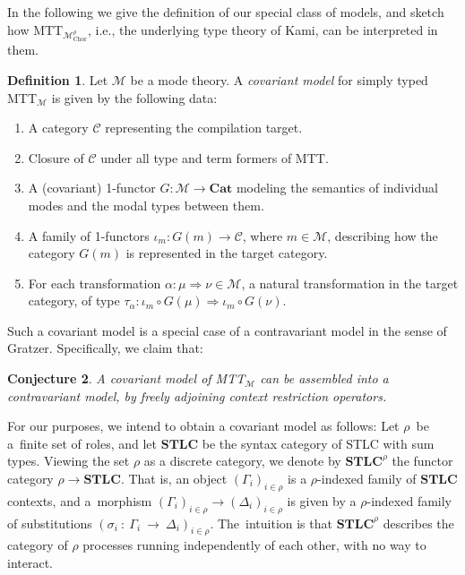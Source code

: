 \documentclass{scrartcl}
\theoremstyle{definition}
\newtheorem{definition}{Definition}
\theoremstyle{plain}
\newtheorem{conjecture}[definition]{Conjecture}
\begin{document}
In the following we give the definition of our special class of models, and
sketch how MTT${}_{\mathcal{M}^\rho_{\textrm{Chor}}}$, i.e., the underlying
type theory of Kami, can be interpreted in them.
\begin{definition}
  Let $\mathcal{M}$ be a mode theory. A \emph{covariant model} for
  simply typed MTT$_{\mathcal{M}}$ is given by the following data:
  \begin{enumerate}
  \item
    A category $\mathcal{C}$ representing the compilation target.
  \item
    Closure of $\mathcal{C}$ under all type and term formers of MTT.
  \item
    A (covariant) 1-functor $G : \mathcal{M} \to \textbf{Cat}$ modeling the
    semantics of individual modes and the modal types between them.
  \item
    A family of 1-functors $\iota_m : G(m) \to \mathcal{C}$, where $m \in
    \mathcal{M}$, describing how the category $G(m)$ is represented in the
    target category.
  \item
    For each transformation $\alpha : \mu \Rightarrow \nu \in \mathcal{M}$, a
    natural transformation in the target category, of type $\tau_\alpha :
    \iota_m \circ G(\mu) \Rightarrow \iota_m \circ G(\nu)$.
  \end{enumerate}
\end{definition}
Such a covariant model is a special case of a contravariant model in the sense
of Gratzer. Specifically, we claim that:
\begin{conjecture}
  A covariant model of {\upshape MTT$_{\mathcal{M}}$} can be assembled into a
  contravariant model, by freely adjoining context restriction operators.
\end{conjecture}
For our purposes, we intend to obtain a covariant model as follows: Let
$\rho$~be a~finite set of roles, and let $\textbf{STLC}$ be the syntax category
of STLC with sum types. Viewing the set $\rho$ as a discrete category, we
denote by $\textbf{STLC}^\rho$ the functor category $\rho \to \textbf{STLC}$.
That is, an object $(\Gamma_i)_{i\in\rho}$ is a $\rho$-indexed family of
$\textbf{STLC}$ contexts, and a~morphism $(\Gamma_i)_{i\in\rho} \to
(\Delta_i)_{i\in\rho}$ is given by a $\rho$-indexed family of substitutions
$(\sigma_i~:~\Gamma_i~\to~\Delta_i)_{i\in\rho}$. The~intuition is that
$\textbf{STLC}^\rho$ describes the category of $\rho$ processes running
independently of each other, with no way to interact.
\end{document}
